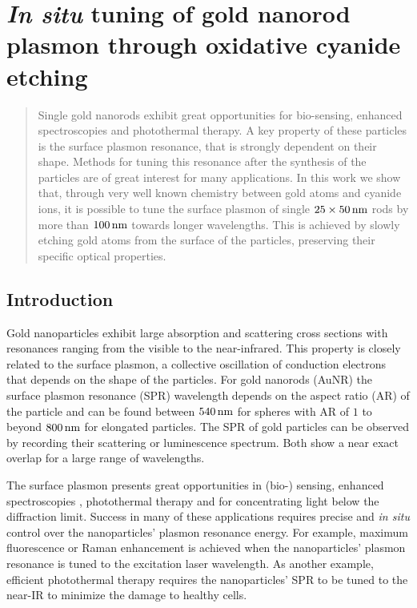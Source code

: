 
\chapter[Cyanide Etching]{\textit{In situ} tuning of gold nanorod plasmon
through oxidative cyanide etching}
\label{ch:KCN}

\begin{abstract}
Single gold nanorods exhibit great opportunities for
bio-sensing, enhanced spectroscopies and photothermal therapy. A key property of these
particles is the surface plasmon resonance, that is strongly dependent on their
shape. Methods for tuning this resonance after the synthesis of the particles
are of great interest for many applications. In this work we show that, through
very well known chemistry between gold atoms and cyanide ions, it is possible
to tune the surface plasmon of single $25\times50\,\textrm{nm}$ rods by more than $100\,\textrm{nm}$
towards longer wavelengths. This is achieved by slowly etching gold atoms from
the surface of the particles, preserving their specific optical properties.
\end{abstract}	

\newpage

\section{Introduction}

Gold nanoparticles exhibit large absorption and scattering cross sections with
resonances ranging from the visible to the near-infrared. This property is
closely related to the surface plasmon, a collective oscillation of conduction
electrons that depends on the shape of the particles. For gold nanorods (AuNR)
the surface plasmon resonance (SPR) wavelength depends on the aspect ratio (AR)
of the particle and can be found between $540\,\textrm{nm}$ for spheres with AR of $1$ to
beyond $800\,\textrm{nm}$ for elongated particles. The SPR of gold particles
can be observed by recording their scattering or luminescence
spectrum\cite{Sonnichsen2002}. Both show a near exact overlap for a large range
of wavelengths\cite{Yorulmaz2012}.

The surface plasmon presents great opportunities in (bio-)
sensing\cite{Zijlstra2012}, enhanced spectroscopies \cite{Sivapalan2013},
photothermal therapy\cite{Zhao2014} and for concentrating light below the
diffraction limit\cite{Zijlstra2011}. Success in many of these applications
requires precise and \textit{in situ} control over the nanoparticles' plasmon
resonance energy. For example, maximum fluorescence\cite{Khatua2014} or Raman
enhancement\cite{McFarland2005} is achieved when the nanoparticles' plasmon
resonance is tuned to the excitation laser wavelength. As another example,
efficient photothermal therapy requires the nanoparticles' SPR to be tuned to
the near-IR to minimize the damage to healthy cells\cite{Alkilany2012}.

